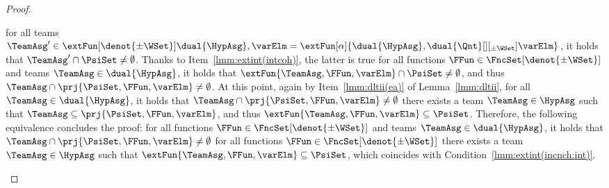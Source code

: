 \documentclass[authoryear]{elsarticle}
\newcommand{\EmpTeamAsg}{\emptyset}
\begin{document}
\begin{proof}
\begin{itemize}[$\bullet$]
       \iff for all teams $\TeamAsg' \in
      \extFun[\denot{\pm\WSet}]{\dual{\HypAsg}, \varElm} =
      \extFun[\alpha]{\dual{\HypAsg}, \dual{\Qnt}[][_{\pm\WSet}] \varElm}$, it
      holds that $\TeamAsg' \cap \PsiSet \allowbreak \neq \EmpTeamAsg$.
      Thanks to Item~\ref{lmm:extint(intcoh)}, the latter is true \iff for all
      functions $\FFun \in \FncSet[\denot{\pm\WSet}]{}$ and teams $\TeamAsg \in
      \dual{\HypAsg}$, it holds that $\extFun{\TeamAsg, \FFun, \varElm} \cap
      \PsiSet \neq \EmpTeamAsg$, and thus $\TeamAsg \cap \prj{\PsiSet, \FFun,
        \varElm} \neq \EmpTeamAsg$.
      At this point, again by Item~\ref{lmm:dltii(ea)} of Lemma~\ref{lmm:dltii},
      for all $\TeamAsg \in \dual{\HypAsg}$, it holds that $\TeamAsg \cap
      \prj{\PsiSet, \FFun, \varElm} \neq \EmpTeamAsg$ \iff there exists a team
      $\TeamAsg \in \HypAsg$ such that $\TeamAsg \subseteq \prj{\PsiSet, \FFun,
        \varElm}$, and thus $\extFun{\TeamAsg, \FFun, \varElm} \subseteq
      \PsiSet$.
      Therefore, the following equivalence concludes the proof: for all
      functions $\FFun \in \FncSet[\denot{\pm\WSet}]{}$ and teams $\TeamAsg \in
      \dual{\HypAsg}$, it holds that $\TeamAsg \cap \prj{\PsiSet, \FFun,
        \varElm} \neq \EmpTeamAsg$ \iff for all functions $\FFun \in
      \FncSet[\denot{\pm\WSet}]{}$ there exists a team $\TeamAsg \in \HypAsg$
      such that $\extFun{\TeamAsg, \FFun, \varElm} \subseteq \PsiSet$, which
      coincides with Condition~\ref{lmm:extint(incnch:int)}.


\end{itemize}
\end{proof}
\end{document}
